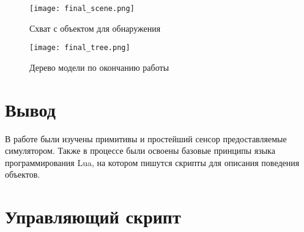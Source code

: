 \documentclass[14pt]{extarticle}
\begin{document}
    \begin{figure}[H]
        \centering
        \texttt{[image: final\_scene.png]}
        \caption{Схват с объектом для обнаружения}
        \label{pic:final scene}
    \end{figure}

    \begin{figure}[H]
        \centering
        \texttt{[image: final\_tree.png]}
        \caption{Дерево модели по окончанию работы}
        \label{pic:final tree}
    \end{figure}

    \section*{Вывод}
    В работе были изучены примитивы и простейший сенсор предоставляемые симулятором. Также в процессе
    были освоены базовые принципы языка программирования Lua, на котором пишутся скрипты для описания
    поведения объектов.


    \appendix
    \renewcommand{\thesection}{\Asbuk{section}}
    \section{Управляющий скрипт}\label{code:script}
\end{document}
